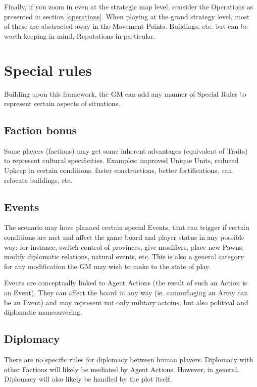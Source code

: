 Finally, if you zoom in even at the strategic map level, consider the Operations as presented in section \ref{operations}. When playing at the grand strategy level, most of these are abstracted away in the Movement Points, Buildings, etc. but can be worth keeping in mind, Reputations in particular.


\section{Special rules}

Building upon this framework, the GM can add any manner of Special Rules to represent certain aspects of situations.


\subsection{Faction bonus}

Some players (factions) may get some inherent advantages (equivalent of Traits) to represent cultural specificities. Examples: improved Unique Units, reduced Upkeep in certain conditions, faster constructions, better fortifications, can relocate buildings, etc.

\subsection{Events}

The scenario may have planned certain special Events, that can trigger if certain conditions are met and affect the game board and player status in any possible way: for instance, switch control of provinces, give modifiers, place new Pawns, modify diplomatic relations, natural events, etc. This is also a general category for any modification the GM may wish to make to the state of play.

Events are conceptually linked to Agent Actions (the result of such an Action is an Event). They can affect the board in any way (ie. camouflaging an Army can be an Event) and may represent not only military actoins, but also political and diplomatic maneouvering.

\subsection{Diplomacy}

There are no specific rules for diplomacy between human players. Diplomacy with other Factions will likely be mediated by Agent Actions. However, in general, Diplomacy will also likely be handled by the plot itself. 

